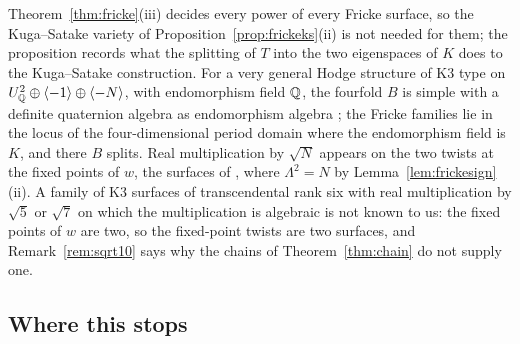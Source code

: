 \begin{remark}\label{rem:frickefixed}
Theorem~\ref{thm:fricke}(iii) decides every power of every Fricke surface, so the Kuga--Satake variety of Proposition~\ref{prop:frickeks}(ii) is not needed for them; the proposition records what the splitting of $T$ into the two eigenspaces of $K$ does to the Kuga--Satake construction. For a very general Hodge structure of K3 type on $U_{\mathbb{Q}}^{2}\oplus\langle-1\rangle\oplus\langle-N\rangle$, with endomorphism field $\mathbb{Q}$, the fourfold $B$ is simple with a definite quaternion algebra as endomorphism algebra \cite[Prop.~5.7]{vG08}; the Fricke families lie in the locus of the four-dimensional period domain where the endomorphism field is $K$, and there $B$ splits. Real multiplication by $\sqrt N$ appears on the two twists at the fixed points of $w$, the surfaces of \cite[\S7.6, Prop.~7.7]{vGS25}, where $\Lambda^{2}=N$ by Lemma~\ref{lem:frickesign}(ii). A family of K3 surfaces of transcendental rank six with real multiplication by $\sqrt5$ or $\sqrt7$ on which the multiplication is algebraic is not known to us: the fixed points of $w$ are two, so the fixed-point twists are two surfaces, and Remark~\ref{rem:sqrt10} says why the chains of Theorem~\ref{thm:chain} do not supply one.
\end{remark}

\subsection{Where this stops}\label{ssec:f3stop}

